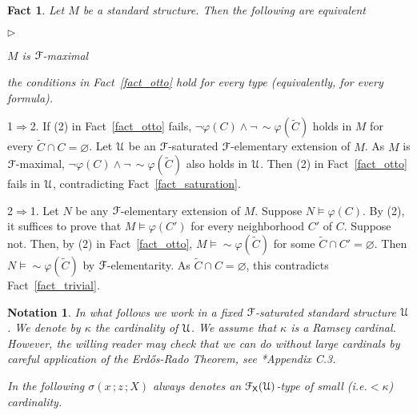 \documentclass{amsproc}
\makeatletter
\newcommand{\mylabel}[1]{{#1}\hfill}
\renewenvironment{itemize}
  {\begin{list}{$\triangleright$}{%
  \setlength{\parskip}{0mm}
  \setlength{\topsep}{.1\baselineskip}
  \setlength{\rightmargin}{0mm}
  \setlength{\listparindent}{0mm}
  \setlength{\itemindent}{0mm}
  \setlength{\labelwidth}{3ex}
  \setlength{\itemsep}{.1\baselineskip}
  \setlength{\parsep}{.1\baselineskip}
  \setlength{\partopsep}{0mm}
  \setlength{\labelsep}{1ex}
  \setlength{\leftmargin}{\labelwidth+\labelsep}
  \let\makelabel\mylabel}}{%
\end{list}}
\newcounter{thm}
\theoremstyle{mio}
\newtheorem{fact}[thm]{Fact}\tcolorboxenvironment{fact}{mythm}
\newtheorem{notation}[thm]{Notation}\tcolorboxenvironment{notation}{mythm}
\providecommand{\proofNameStyle}{\bfseries}
\renewenvironment{proof}[1][\proofname]{\par
  \pushQED{\qed}%
  \normalfont%
  \trivlist
  \item[\hskip\labelsep
        \proofNameStyle
    #1\@addpunct{.}]\ignorespaces
}{%
  \popQED\endtrivlist\@endpefalse
}
\makeatother
\begin{document}
\begin{fact}\label{fact_maximal}
  Let $M$ be a standard structure.
  Then the following are equivalent
  \begin{itemize}
    \item [1.] $M$ is ${\EuScript F}$-maximal
    \item [2.] the conditions in Fact~\ref{fact_otto} hold for every type (equivalently, for every formula). 
  \end{itemize}
\end{fact}

\begin{proof}
  1$\Rightarrow$2.
  If (2) in Fact~\ref{fact_otto} fails, $\neg\varphi(C)\wedge\neg\,{\sim}\varphi(\tilde C)$ holds in $M$ for every $\tilde C\cap C=\varnothing$.
  Let ${\EuScript U}$ be an ${\EuScript F}$-saturated ${\EuScript F}$-elementary extension of $M$.
  As $M$ is ${\EuScript F}$-maximal, $\neg\varphi(C)\wedge\neg\,{\sim}\varphi(\tilde C)$ also holds in ${\EuScript U}$.
  Then (2) in Fact~\ref{fact_otto} fails in ${\EuScript U}$, contradicting Fact~\ref{fact_saturation}.

  2$\Rightarrow$1. 
  Let $N$ be any ${\EuScript F}$-elementary extension of $M$.
  Suppose $N\models\varphi(C)$.
  By (2), it suffices to prove that $M\models\varphi(C')$ for every neighborhood $C'$ of $C$.
  Suppose not.
  Then, by (2) in Fact~\ref{fact_otto}, $M\models{\sim}\varphi(\tilde C)$ for some $\tilde C\cap C'=\varnothing$.
  Then $N\models{\sim}\varphi(\tilde C)$ by ${\EuScript F}$-elementarity.
  As $\tilde C\cap C=\varnothing$, this contradicts Fact~\ref{fact_trivial}.
\end{proof}

\begin{notation}
  In what follows we work in a fixed ${\EuScript F}$-saturated standard structure ${\EuScript U}$.
  We denote by $\kappa$ the cardinality of ${\EuScript U}$.
  We assume that $\kappa$ is a Ramsey cardinal.
  However, the willing reader may check that we can do without large cardinals by careful application of the Erd\H{o}s-Rado Theorem, see \cite{TZ}*{Appendix C.3}.\smallskip

  In the following $\sigma(x\,;z\,;X)$ always denotes an ${\EuScript F}_{\sf X}({\EuScript U})$-type of small (i.e.\@ $<\kappa$) cardinality.
\end{notation}


\end{document}
